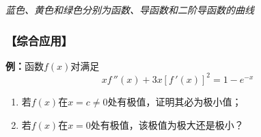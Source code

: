 \begin{center}
	\quad
	
	{\it 蓝色、黄色和绿色分别为函数、导函数和二阶导函数的曲线}
\end{center}

\subsubsection{【综合应用】}

{\bf 例：}函数$f(x)$对满足
$$xf\,''(x)+3x[f\,'(x)]^2=1-e^{-x}$$
\begin{enumerate}[(1)]
  \setlength{\itemindent}{1cm}
  \item 若$f(x)$在$x=c\ne 0$处有极值，证明其必为极小值；
  \item 若$f(x)$在$x=0$处有极值，该极值为极大还是极小？
\end{enumerate}

